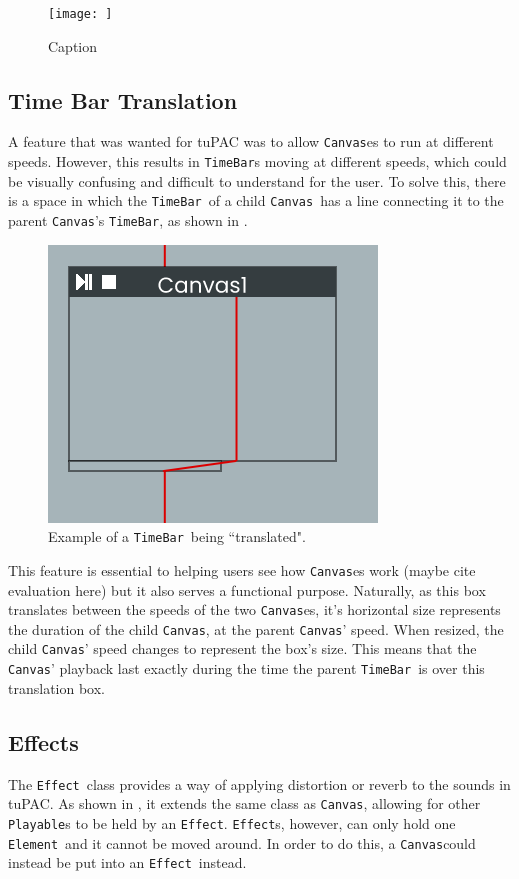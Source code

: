\documentclass[12pt,a4paper,twoside,openright]{report}
\newcommand{\element}{\texttt{Element}}
\newcommand{\canvas}{\texttt{Canvas}}
\newcommand{\timebar}{\texttt{TimeBar}}
\newcommand{\playable}{\texttt{Playable}}
\newcommand{\effect}{\texttt{Effect}}
\begin{document}
\begin{figure}
    \centering
    \texttt{[image: ]}
    \caption{Caption}
    \label{fig:my_label}
\end{figure}

\subsection{Time Bar Translation}\label{sec:timebar_translate}
A feature that was wanted for tuPAC was to allow \canvas es to run at different speeds. However, this results in \timebar s moving at different speeds, which could be visually confusing and difficult to understand for the user. To solve this, there is a space in which the \timebar\ of a child \canvas\ has a line connecting it to the parent \canvas's \timebar, as shown in .

\begin{figure}[h]
    \centering
    \includegraphics{images/timebartranslate.png}
    \caption{Example of a \timebar\ being ``translated".}
    \label{fig:timebartranslation}
\end{figure}

This feature is essential to helping users see how \canvas es work (maybe cite evaluation here) but it also serves a functional purpose. Naturally, as this box translates between the speeds of the two \canvas es, it's horizontal size represents the duration of the child \canvas, at the parent \canvas' speed. When resized, the child \canvas' speed changes to represent the box's size. This means that the \canvas' playback last exactly during the time the parent \timebar\ is over this translation box.

\subsection{Effects}
The \effect\ class provides a way of applying distortion or reverb to the sounds in tuPAC. As shown in , it extends the same class as \canvas, allowing for other \playable s to be held by an \effect. \effect s, however, can only hold one \element\ and it cannot be moved around. In order to do this, a \canvas could instead be put into an \effect\ instead.
\end{document}
